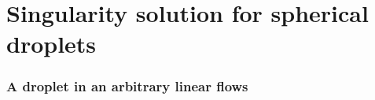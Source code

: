 
\section{Singularity solution for spherical droplets}

\subsubsection*{A droplet in an arbitrary linear flows}


